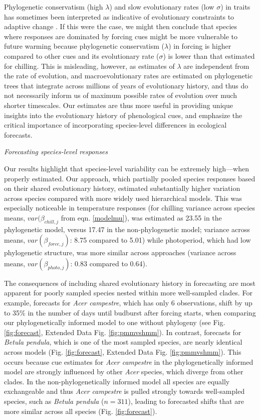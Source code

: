 \documentclass[11pt]{article}
\begin{document}
\par Phylogenetic conservatism (high $\lambda$) and slow evolutionary rates (low $\sigma$) in traits has sometimes been interpreted as indicative of evolutionary constraints to adaptive change \citep{wiens2010niche,bennett2021evolution}. If this were the case, we might then conclude that species where responses are dominated by forcing cues might be more vulnerable to future warming because phylogenetic conservatism ($\lambda$) in forcing is higher compared to other cues and its evolutionary rate ($\sigma$) is lower than that estimated for chilling. This is misleading, however, as estimates of $\lambda$ are independent from the rate of evolution, and macroevolutionary rates are estimated on phylogenetic trees that integrate across millions of years of evolutionary history, and thus do not necessarily inform us of maximum possible rates of evolution over much shorter timescales. Our estimates are thus more useful in providing unique insights into the evolutionary history of phenological cues, and emphasize the critical importance of incorporating species-level differences in ecological forecasts.


\emph{Forecasting species-level responses}

\par Our results highlight that species-level variability can be extremely high---when properly estimated. Our approach, which partially pooled species responses based on their shared evolutionary history, estimated substantially higher variation across species compared with more widely used hierarchical models. This was especially noticeable in temperature responses (for chilling variance across species means, $var(\beta_{chill,j}$ from eqn. \ref{modelmu}), was estimated as 23.55 in the phylogenetic model, versus 17.47 in the non-phylogenetic model; variance across means, $var(\beta_{force,j})$: 8.75 compared to 5.01) while photoperiod, which had low phylogenetic structure, was more similar across approaches (variance across means, $var(\beta_{photo,j})$: 0.83 compared to 0.64). 

\par The consequences of including shared evolutionary history in forecasting are most apparent for poorly sampled species nested within more well-sampled clades. For example, forecasts for \emph{Acer campestre}, which has only 6 observations, shift by up to 35\% in the number of days until budburst after forcing starts, when comparing our phylogenetically informed model to one without phylogeny (see Fig. \ref{fig:forecast}, Extended Data Fig. \ref{fig:pmmvshmm}). In contrast, forecasts for \emph{Betula pendula}, which is one of the most sampled species, are nearly identical across models (Fig. \ref{fig:forecast}, Extended Data Fig. \ref{fig:pmmvshmm}). This occurs because cue estimates for \emph{Acer campestre} in the phylogenetically informed model are strongly influenced by other \emph{Acer} species, which diverge from other clades. In the non-phylogenetically informed model all species are equally exchangeable and thus \emph{Acer campestre} is pulled strongly towards well-sampled species, such as \emph{Betula pendula} ($n = 311$), leading to forecasted shifts that are more similar across all species (Fig. \ref{fig:forecast}). 
\end{document}
